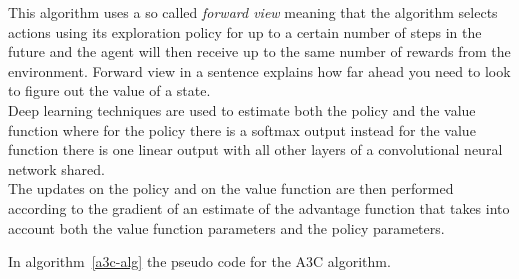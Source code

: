 This algorithm uses a so called \textit{forward view} meaning that the algorithm selects actions using its exploration policy for up to a certain number of steps in the future and the agent will then receive up to the same number of rewards from the environment. Forward view in a sentence explains how far ahead you need to look to figure out the value of a state. \\
Deep learning techniques are used to estimate both the policy and the value function where for the policy there is a softmax output instead for the value function there is one linear output with all other layers of a convolutional neural network shared. \\
The updates on the policy and on the value function are then performed according to the gradient of an estimate of the advantage function that takes into account both the value function parameters and the policy parameters.

In algorithm~\ref{a3c-alg} the pseudo code for the A3C algorithm.